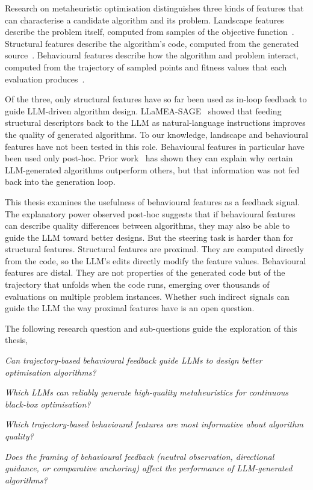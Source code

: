 Research on metaheuristic optimisation distinguishes three kinds of features that can characterise a candidate algorithm and its problem. Landscape features describe the problem itself, computed from samples of the objective function~\cite{mersmann2011ela,malan2013landscape}. Structural features describe the algorithm's code, computed from the generated source~\cite{vanStein2026LLaMEASAGE}. Behavioural features describe how the algorithm and problem interact, computed from the trajectory of sampled points and fitness values that each evaluation produces~\cite{cenikj2023dynamorep,vanStein2025Behaviour}.

Of the three, only structural features have so far been used as in-loop feedback to guide LLM-driven algorithm design. LLaMEA-SAGE~\cite{vanStein2026LLaMEASAGE} showed that feeding structural descriptors back to the LLM as natural-language instructions improves the quality of generated algorithms. To our knowledge, landscape and behavioural features have not been tested in this role. Behavioural features in particular have been used only post-hoc. Prior work~\cite{vanStein2025Behaviour} has shown they can explain why certain LLM-generated algorithms outperform others, but that information was not fed back into the generation loop.

This thesis examines the usefulness of behavioural features as a feedback signal. The explanatory power observed post-hoc suggests that if behavioural features can describe quality differences between algorithms, they may also be able to guide the LLM toward better designs. But the steering task is harder than for structural features. Structural features are proximal. They are computed directly from the code, so the LLM's edits directly modify the feature values. Behavioural features are distal. They are not properties of the generated code but of the trajectory that unfolds when the code runs, emerging over thousands of evaluations on multiple problem instances. Whether such indirect signals can guide the LLM the way proximal features have is an open question.

The following research question and sub-questions guide the exploration of this thesis,

\medskip

\begin{description}[leftmargin=4.5em, labelwidth=3.7em, labelsep=0.6em, itemsep=0.45em, align=left, font=\normalfont\bfseries]
  \item[RQ.] \itshape Can trajectory-based behavioural feedback guide LLMs to design better optimisation algorithms?
  \item[SubQ1.] \itshape Which LLMs can reliably generate high-quality metaheuristics for continuous black-box optimisation?
  \item[SubQ2.] \itshape Which trajectory-based behavioural features are most informative about algorithm quality?
  \item[SubQ3.] \itshape Does the framing of behavioural feedback (neutral observation, directional guidance, or comparative anchoring) affect the performance of LLM-generated algorithms?
\end{description}

